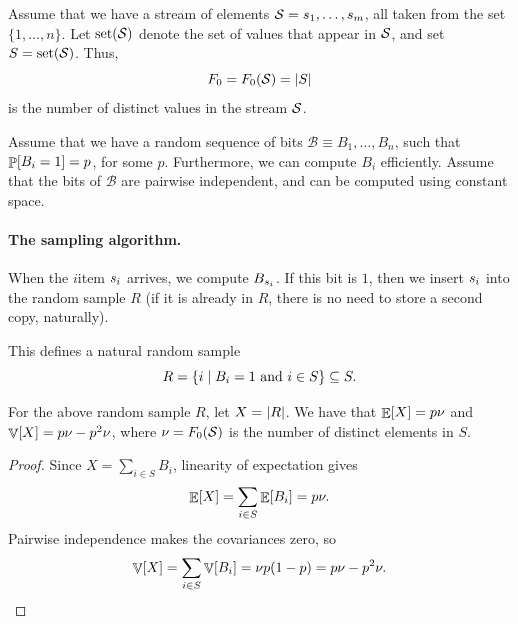 Assume that we have a stream of elements
$\mathcal{S} = {s}_1, \ldots, {s}_m$, all taken from the set
$\{1,\ldots, n\}$.  Let $\distinctX{\STRM}$ denote the set of values that
appear in $\mathcal{S}$, and set $S=\distinctX{\STRM}$. Thus,
\begin{equation*}
    F_0 = F_0(\mathcal{S}) = \left| {S} \right|
\end{equation*}
is the number of distinct values in the stream $\mathcal{S}$.


Assume that we have a random sequence of bits
$\mathcal{B} \equiv B_1, \ldots, B_n$, such that $\Prob{B_i=1} =p$, for
some $p$. Furthermore, we can compute $B_i$ efficiently. Assume that the
bits of $\mathcal{B}$ are pairwise independent, and can be computed using constant
space.


\paragraph*{The sampling algorithm.}
When the $i$\th item ${s}_i$ arrives, we compute $B_{{s}_i}$. If this
bit is $1$, then we insert ${s}_i$ into the random sample $R$ (if it is
already in $R$, there is no need to store a second copy, naturally).


This defines a natural random sample
\begin{equation*}
    R = \left\{ i \;\middle\vert\; B_i =1 \text{ and } i \in S \right\} \subseteq S.
\end{equation*}

\begin{lemma}
    For the above random sample $R$, let $X = \left| {R} \right|$. We have
    that $\mathop{\mathbb{E}}\!\left[ {X} \right] = p \nu$ and $\mathop{\mathbb{V}}\!\left[ {X} \right] = p \nu - p^2 \nu$, where
    $\nu = F_0(\mathcal{S})$ is the number of distinct elements in $S$.
\end{lemma}
\begin{proof}
    Since $X=\sum_{i\in S}B_i$, linearity of expectation gives
    \[
        \mathop{\mathbb{E}}\!\left[ {X} \right]=\sum_{i\in S}\mathop{\mathbb{E}}\!\left[ {B_i} \right]=p\nu.
    \]
    Pairwise independence makes the covariances zero, so
    \[
        \mathop{\mathbb{V}}\!\left[ {X} \right]=\sum_{i\in S}\mathop{\mathbb{V}}\!\left[ {B_i} \right]
        =\nu p(1-p)=p\nu-p^2\nu.
    \]
\end{proof}
  
